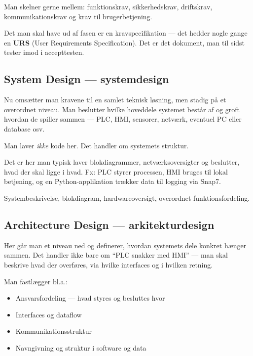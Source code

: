 \documentclass[12pt, a4paper]{article}
\begin{document}
Man skelner gerne mellem: funktionskrav, sikkerhedskrav, driftskrav, kommunikationskrav og krav til brugerbetjening.

Det man skal have ud af fasen er en kravspecifikation --- det hedder nogle gange en \textbf{URS} (User Requirements Specification).
Det er det dokument, man til sidst tester imod i accepttesten.

\subsection{System Design --- systemdesign}

Nu omsætter man kravene til en samlet teknisk løsning, men stadig på et overordnet niveau.
Man beslutter hvilke hoveddele systemet består af og groft hvordan de spiller sammen --- PLC, HMI, sensorer, netværk, eventuel PC eller database osv.

Man laver \textit{ikke} kode her. Det handler om systemets struktur.

Det er her man typisk laver blokdiagrammer, netværksoversigter og beslutter, hvad der skal ligge i hvad.
Fx: PLC styrer processen, HMI bruges til lokal betjening, og en Python-applikation trækker data til logging via Snap7.

\begin{tcolorbox}[tipbox, title={\faCheckSquare\quad Output fra fasen}]
Systembeskrivelse, blokdiagram, hardwareoversigt, overordnet funktionsfordeling.
\end{tcolorbox}

\subsection{Architecture Design --- arkitekturdesign}

Her går man et niveau ned og definerer, hvordan systemets dele konkret hænger sammen.
Det handler ikke bare om ``PLC snakker med HMI'' --- man skal beskrive hvad der overføres, via hvilke interfaces og i hvilken retning.

Man fastlægger bl.a.:

\begin{itemize}[leftmargin=1.5em, itemsep=2pt]
  \item Ansvarsfordeling --- hvad styres og besluttes hvor
  \item Interfaces og dataflow
  \item Kommunikationsstruktur
  \item Navngivning og struktur i software og data
\end{itemize}
\end{document}
